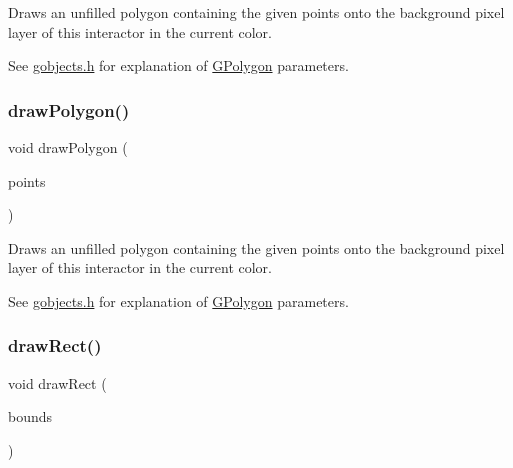 Draws an unfilled polygon containing the given points onto the background pixel layer of this interactor in the current color. 

See \mbox{\hyperlink{gobjects_8h_source}{gobjects.\+h}} for explanation of \mbox{\hyperlink{classsgl_1_1GPolygon}{G\+Polygon}} parameters. \mbox{\label{classsgl_1_1GDrawingSurface_a021ee881e0d154dc4dd059698742889c}} 
\subsubsection{\texorpdfstring{draw\+Polygon()}{drawPolygon()}\hspace{0.1cm}{\footnotesize\ttfamily [2/2]}}
{\footnotesize\ttfamily void draw\+Polygon (\begin{DoxyParamCaption}\item[{std\+::initializer\+\_\+list$<$ \mbox{\hyperlink{structsgl_1_1GPoint}{G\+Point}} $>$}]{points }\end{DoxyParamCaption})\hspace{0.3cm}{\ttfamily [virtual]}}



Draws an unfilled polygon containing the given points onto the background pixel layer of this interactor in the current color. 

See \mbox{\hyperlink{gobjects_8h_source}{gobjects.\+h}} for explanation of \mbox{\hyperlink{classsgl_1_1GPolygon}{G\+Polygon}} parameters. \mbox{\label{classsgl_1_1GDrawingSurface_a3dd4cc5891149dfc36746264f7289877}} 
\subsubsection{\texorpdfstring{draw\+Rect()}{drawRect()}\hspace{0.1cm}{\footnotesize\ttfamily [1/2]}}
{\footnotesize\ttfamily void draw\+Rect (\begin{DoxyParamCaption}\item[{const \mbox{\hyperlink{structsgl_1_1GRectangle}{G\+Rectangle}} \&}]{bounds }\end{DoxyParamCaption})\hspace{0.3cm}{\ttfamily [virtual]}}




